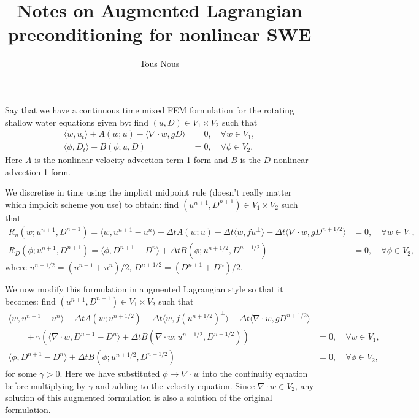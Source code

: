 \documentclass{article}
\begin{document}
\title{Notes on Augmented Lagrangian preconditioning for nonlinear SWE}
\author{Tous Nous}
\maketitle

Say that we have a continuous time mixed FEM formulation for the
rotating shallow water equations given by:
find $(u,D)\in V_1\times V_2$ such that
\begin{align}
  \langle w, u_t \rangle + A(w; u) - \langle \nabla\cdot w, gD\rangle
  & = 0, \quad \forall w \in V_1, \\
  \langle \phi, D_t \rangle + B(\phi; u, D) & = 0, \quad \forall \phi\in V_2.
\end{align}
Here $A$ is the nonlinear velocity advection term 1-form and $B$ is
the $D$ nonlinear advection 1-form.

We discretise in time using the implicit midpoint rule (doesn't really matter
which implicit scheme you use) to obtain: find $(u^{n+1},D^{n+1})
\in V_1\times V_2$ such that
\begin{align}
  R_u(w;u^{n+1},D^{n+1}) = \langle w, u^{n+1}-u^n \rangle + \Delta t A(w; u)
  + \Delta t\langle w, fu^{\perp}\rangle
  - \Delta t\langle \nabla\cdot w, gD^{n+1/2}\rangle
  & = 0, \quad \forall w \in V_1, \\
  R_D(\phi; u^{n+1},D^{n+1}) = \langle \phi, D^{n+1} - D^n \rangle
  + \Delta t B(\phi; u^{n+1/2},D^{n+1/2}) & = 0, \quad \forall \phi\in V_2,
\end{align}
where $u^{n+1/2} = (u^{n+1}+u^n)/2$, $D^{n+1/2}=(D^{n+1}+D^n)/2$.

We now modify this formulation in augmented Lagrangian style so that
it becomes: find $(u^{n+1},D^{n+1}) \in V_1\times V_2$ such that
\begin{align}
  \nonumber
  \langle w, u^{n+1}-u^n \rangle + \Delta t A(w; u^{n+1/2})
  + \Delta t\langle w, f(u^{n+1/2})^{\perp}\rangle
  - \Delta t\langle \nabla\cdot w, gD^{n+1/2}\rangle & \\
  \qquad + \gamma\left(
  \langle \nabla\cdot w, D^{n+1} - D^n \rangle
  + \Delta t B(\nabla\cdot w; u^{n+1/2},D^{n+1/2})
  \right)
  & = 0, \quad \forall w \in V_1, \\
  \langle \phi, D^{n+1} - D^n \rangle
  + \Delta t B(\phi; u^{n+1/2},D^{n+1/2}) & = 0, \quad \forall \phi\in V_2,
\end{align}
for some $\gamma>0$.  Here we have substituted $\phi\to \nabla\cdot w$
into the continuity equation before multiplying by $\gamma$ and adding
to the velocity equation. Since $\nabla\cdot w\in V_2$, any solution
of this augmented formulation is also a solution of the original
formulation.
\end{document}
